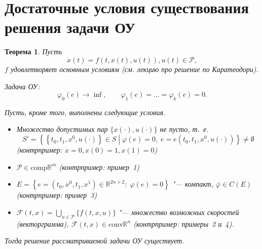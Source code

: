 \documentclass[12pt, a4paper]{article}
\theoremstyle{rusdef}
\newtheorem{theorem}{Теорема}
\newcommand{\R}{\ensuremath{\mathbb{R}}} %
\renewcommand{\P}{\mathscr{P}} %
\begin{document}
\section{Достаточные условия существования решения задачи ОУ}
\begin{theorem}
  Пусть
  \[
    \dot{x}(t) = f(t, x(t), u(t)), u(t) \in \P,
  \]
  $f$ удовлетворяет основным условиям (см. лекцию про решение по Каратеодори).
  
  Задача ОУ:
  \[
    \varphi_0(e) \to \inf, \qquad \varphi_1(e) = \ldots = \varphi_k(e) = 0.
  \]

  Пусть, кроме того, выполнены следующие условия.

  \begin{itemize}
    \item[а)] Множество допустимых пар $\{ x(\cdot), u(\cdot) \}$ не пусто, т.~е.
    \[
      S' = \left\{ \left\{ t_0, t_1, x^0, u(\cdot) \right\} \in S \middle\vert \varphi(e) = 0, \; e = e(t_0, t_1, x^0, u(\cdot))  \right\} \neq \emptyset
    \] 
    (контрпример: $\dot{x} = 0, x(0) = 1, x(1) = 0$)
    \item[б)] $\P \in \mathrm{comp} \R^m$ (контрпример: пример~1)
    \item[в)] $E = \left\{ e = (t_0, x^0, t_1, x^1) \in \R^{2n + 2} \colon\; \varphi(e) = 0 \right\}$ "--- компакт, $\bar{\varphi} \in C(E)$ (контрпример: пример~3)
    \item[г)]  $\mathcal{F}(t,x) = \bigcup\limits_{u \in \P} \{f(t,x,u)\}$ "--- множество возможных скоростей (векторграмма), $\mathcal{F}(t,x) \in \mathrm{conv} \R^n$ (контрпример: примеры~2 и~4).
  \end{itemize}

  Тогда решение рассматриваемой задачи ОУ существует.
\end{theorem}
\end{document}

